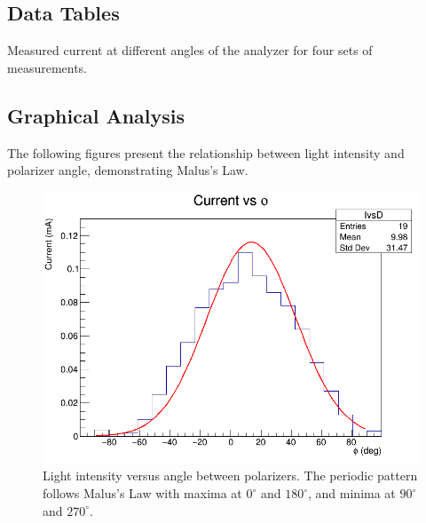 \documentclass[journal]{IEEEtran}
\begin{document}
\subsection{Data Tables}
\begin{table}[H]
    \centering
    \caption{Measured current at different angles of the analyzer for four sets of measurements.}
    \label{tab:intensity_measurements}
\end{table}

\subsection{Graphical Analysis}
The following figures present the relationship between light intensity and polarizer angle, demonstrating Malus's Law.

\begin{figure}[H]
    \centering
    \includegraphics[width=\linewidth]{../plots/I_vs_D.png}
    \caption{Light intensity versus angle between polarizers. The periodic pattern follows Malus's Law with maxima at $0^\circ$ and $180^\circ$, and minima at $90^\circ$ and $270^\circ$.}
    \label{fig:intensity_vs_angle}
\end{figure}
\end{document}
